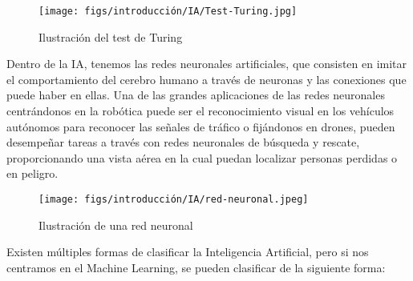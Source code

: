 \begin{figure} [H]
  \begin{center}
    \texttt{[image: figs/introducción/IA/Test-Turing.jpg]}
  \end{center}
  \caption{Ilustración del test de Turing}
  \label{fig:Turing}
\end{figure}

Dentro de la IA, tenemos las redes neuronales artificiales, que consisten en imitar el
comportamiento del cerebro humano a través de neuronas y las conexiones que puede haber
en ellas. Una de las grandes aplicaciones de las redes neuronales centrándonos en la robótica
puede ser el reconocimiento visual en los vehículos autónomos para reconocer las señales de
tráfico o fijándonos en drones, pueden desempeñar tareas a través con redes neuronales de
búsqueda y rescate, proporcionando una vista aérea en la cual puedan localizar personas
perdidas o en peligro. 

\begin{figure} [H]
  \begin{center}
    \texttt{[image: figs/introducción/IA/red-neuronal.jpeg]}
  \end{center}
  \caption{Ilustración de una red neuronal }
  \label{fig:redneuronal}
\end{figure}

Existen múltiples formas de clasificar la Inteligencia Artificial, pero si nos centramos en el
Machine Learning, se pueden clasificar de la siguiente forma: 

